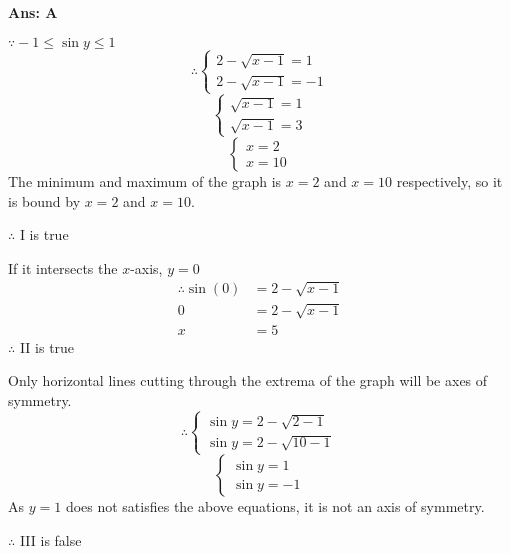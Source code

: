 \documentclass[varwidth=70mm]{standalone}
\begin{document}
\begin{answer}
\hrulefill\par
\textbf{Ans: A}

$\because -1 \le \sin y \le 1$
\begin{equation*}
\therefore\begin{cases}
2-\sqrt{x-1} = 1 \\
2-\sqrt{x-1} = -1 
\end{cases}
\end{equation*}
\begin{equation*}
\begin{cases}
\sqrt{x-1} = 1 \\
\sqrt{x-1} = 3
\end{cases}
\end{equation*}
\begin{equation*}
\begin{cases}
x = 2 \\
x = 10
\end{cases}
\end{equation*}
The minimum and maximum of the graph is $x=2$ and $x=10$ respectively, so it is bound by $x=2$ and $x=10$.

$\therefore$ I is true

If it intersects the $x$-axis, $y=0$
\begin{equation*}
\begin{aligned}
\therefore \sin(0) &= 2-\sqrt{x-1} \\
0 &= 2-\sqrt{x-1} \\
x &= 5 
\end{aligned}
\end{equation*}
$\therefore$ II is true

Only horizontal lines cutting through the extrema of the graph will be axes of symmetry.
\begin{equation*}
\therefore\begin{cases}
\sin y = 2-\sqrt{2-1} \\
\sin y = 2-\sqrt{10-1} 
\end{cases}
\end{equation*}
\begin{equation*}
\begin{cases}
\sin y = 1 \\
\sin y = -1 
\end{cases}
\end{equation*}
As $y=1$ does not satisfies the above equations, it is not an axis of symmetry.

$\therefore$ III is false
\end{answer}
\end{document}

